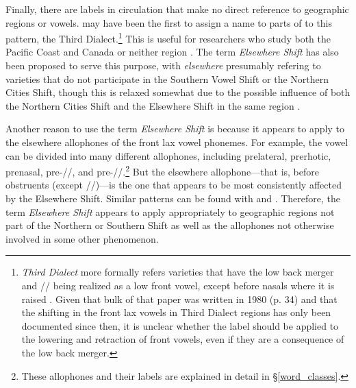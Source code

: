 Finally, there are labels in circulation that make no direct reference to geographic regions or vowels. \citet{labov_1991} may have been the first to assign a name to parts of to this pattern, the Third Dialect.\footnote{\textit{Third Dialect} more formally refers varieties that have the low back merger and /\textipa{\ae}/ being realized as a low front vowel, except before nasals where it is raised \citep[30]{labov_1991}. Given that bulk of that paper was written in 1980 (p. 34) and that the shifting in the front lax vowels in Third Dialect regions has only been documented since then, it is unclear whether the label should be applied to the lowering and retraction of front vowels, even if they are a consequence of the low back merger.} This is useful for researchers who study both the Pacific Coast and Canada \citep{swan_2018} or neither region \citep{durian_2012_diss}. The term \textit{Elsewhere Shift} has also been proposed to serve this purpose, with \textit{elsewhere} presumably refering to varieties that do not participate in the Southern Vowel Shift or the Northern Cities Shift, though this is relaxed somewhat due to the possible influence of both the Northern Cities Shift and the Elsewhere Shift in the same region \citep{mason_2018}.

Another reason to use the term \textit{Elsewhere Shift} is because it appears to apply to the elsewhere allophones of the front lax vowel phonemes. For example, the \trap vowel can be divided into many different allophones, including prelateral, prerhotic, prenasal, pre-//, and pre-//.\footnote{These allophones and their labels are explained in detail in \S\ref{word_classes}.} But the elsewhere allophone---that is, \trap before obstruents (except //)---is the one that appears to be most consistently affected by the Elsewhere Shift. Similar patterns can be found with \dress and \kit. Therefore, the term \textit{Elsewhere Shift} appears to apply appropriately to geographic regions not part of the Northern or Southern Shift as well as the allophones not otherwise involved in some other phenomenon.

